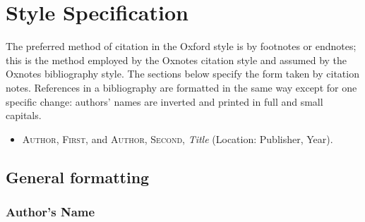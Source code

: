 \documentclass[extrafontsizes,11pt,a4paper,oneside]{memoir}
\newcommand*{\lit}[1]{\textsf{#1}}
\begin{document}
\chapter{Style Specification}

The preferred method of citation in the Oxford style is by footnotes or endnotes; this is the method employed by the Oxnotes citation style and assumed by the Oxnotes bibliography style. The sections below specify the form taken by citation notes. References in a bibliography are formatted in the same way except for one specific change: authors' names are inverted and printed in full and small capitals.

\begin{itemize}
  \item
  \textsc{Author, First}, \lit{and} \textsc{Author, Second}, \emph{Title} (Location: Publisher, Year).
\end{itemize}

\section{General formatting}

\subsection{Author's Name}
\end{document}
